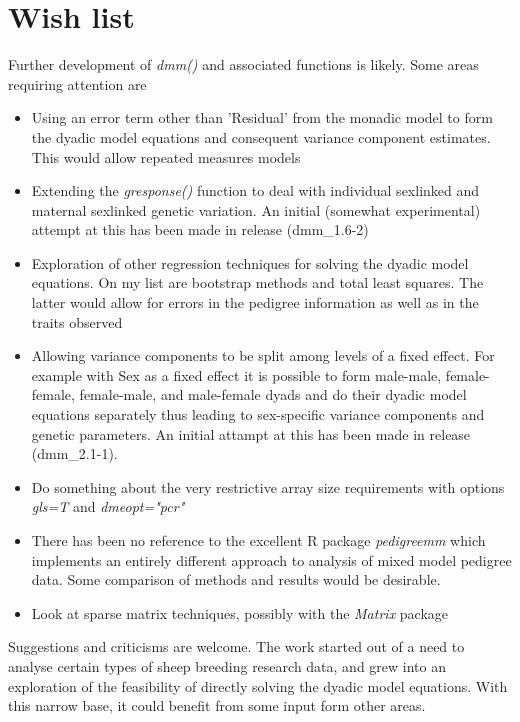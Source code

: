 \documentclass[titlepage]{article}  %
\begin{document}
\section{Wish list}
Further development of {\em dmm()} and associated functions is likely. Some areas requiring attention are
\begin{itemize}
\item Using an error term other than 'Residual' from the monadic model to form the dyadic model equations and consequent variance component estimates. This would allow repeated measures models
\item Extending the {\em gresponse()} function to deal with individual sexlinked and maternal sexlinked genetic variation. An initial (somewhat experimental) attempt at this has been made in release (dmm\_1.6-2)
\item Exploration of other regression techniques for solving the dyadic model equations. On my list are bootstrap methods and total least squares. The latter would allow for errors in the pedigree information as well as in the traits observed
\item Allowing variance components to be split among levels of a fixed effect. For example with Sex as a fixed effect it is possible to form male-male, female-female, female-male, and male-female dyads and do their dyadic model equations separately thus leading to sex-specific variance components and genetic parameters. An initial attampt at this has been made in release (dmm\_2.1-1).
\item Do something about the very restrictive array size requirements with options {\em gls=T} and {\em dmeopt="pcr"}
\item There has been no reference to the excellent R package {\em pedigreemm} which implements an entirely different approach to analysis of mixed model pedigree data. Some comparison of methods and results would be desirable.
\item Look at sparse matrix techniques, possibly with the {\em Matrix} package
\end{itemize}

Suggestions and criticisms are welcome.  The work started out of a need to analyse certain types of sheep breeding research data, and grew into an exploration of the feasibility of directly solving the dyadic model equations. With this narrow base, it could benefit from some input form other areas.
\end{document}
